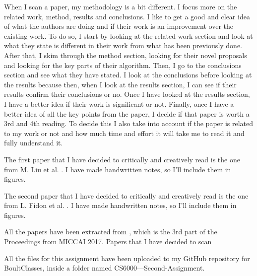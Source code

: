 \documentclass{article}
\begin{document}
When I scan a paper, my methodology is a bit different. I focus more on the related work, method, results and conclusions. I like to get a good and clear idea of what the authors are doing and if their work is an improvement over the existing work. To do so, I start by looking at the related work section and look at what they state is different in their work from what has been previously done. After that, I skim through the method section, looking for their novel proposals and looking for the key parts of their algorithm. Then, I go to the conclusions section and see what they have stated. I look at the conclusions before looking at the results because then, when I look at the results section, I can see if their results confirm their conclusions or no. Once I have looked at the results section, I have a better idea if their work is significant or not. Finally, once I have a better idea of all the key points from the paper, I decide if that paper is worth a 3rd and 4th reading. To decide this I also take into account if the paper is related to my work or not and how much time and effort it will take me to read it and fully understand it.


The first paper that I have decided to critically and creatively read is the one from M. Liu et al. \cite{10.1007/978-3-319-66179-7_1}. I have made handwritten notes, so I'll include them in figures.

The second paper that I have decided to critically and creatively read is the one from L. Fidon et al. \cite{10.1007/978-3-319-66179-7_33}. I have made handwritten notes, so I'll include them in figures.

All the papers have been extracted from \cite{MICCAI}, which is the 3rd part of the Proceedings from MICCAI 2017. 
Papers that I have decided to scan \cite{10.1007/978-3-319-66179-7_1,10.1007/978-3-319-66179-7_5,10.1007/978-3-319-66179-7_10,10.1007/978-3-319-66179-7_26,10.1007/978-3-319-66179-7_27,10.1007/978-3-319-66179-7_33,10.1007/978-3-319-66179-7_36,10.1007/978-3-319-66179-7_38}

All the files for this assignment have been uploaded to my GitHub repository for BoultClasses, inside a folder named CS6000---Second-Assignment.
\end{document}
